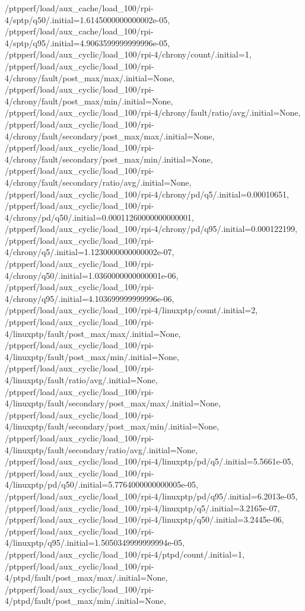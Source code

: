 {    /ptpperf/load/aux_cache/load_100/rpi-4/sptp/q50/.initial=1.6145000000000002e-05,
    /ptpperf/load/aux_cache/load_100/rpi-4/sptp/q95/.initial=4.9063599999999996e-05,
    /ptpperf/load/aux_cyclic/load_100/rpi-4/chrony/count/.initial=1,
    /ptpperf/load/aux_cyclic/load_100/rpi-4/chrony/fault/post_max/max/.initial=None,
    /ptpperf/load/aux_cyclic/load_100/rpi-4/chrony/fault/post_max/min/.initial=None,
    /ptpperf/load/aux_cyclic/load_100/rpi-4/chrony/fault/ratio/avg/.initial=None,
    /ptpperf/load/aux_cyclic/load_100/rpi-4/chrony/fault/secondary/post_max/max/.initial=None,
    /ptpperf/load/aux_cyclic/load_100/rpi-4/chrony/fault/secondary/post_max/min/.initial=None,
    /ptpperf/load/aux_cyclic/load_100/rpi-4/chrony/fault/secondary/ratio/avg/.initial=None,
    /ptpperf/load/aux_cyclic/load_100/rpi-4/chrony/pd/q5/.initial=0.00010651,
    /ptpperf/load/aux_cyclic/load_100/rpi-4/chrony/pd/q50/.initial=0.00011260000000000001,
    /ptpperf/load/aux_cyclic/load_100/rpi-4/chrony/pd/q95/.initial=0.000122199,
    /ptpperf/load/aux_cyclic/load_100/rpi-4/chrony/q5/.initial=1.1230000000000002e-07,
    /ptpperf/load/aux_cyclic/load_100/rpi-4/chrony/q50/.initial=1.0360000000000001e-06,
    /ptpperf/load/aux_cyclic/load_100/rpi-4/chrony/q95/.initial=4.103699999999996e-06,
    /ptpperf/load/aux_cyclic/load_100/rpi-4/linuxptp/count/.initial=2,
    /ptpperf/load/aux_cyclic/load_100/rpi-4/linuxptp/fault/post_max/max/.initial=None,
    /ptpperf/load/aux_cyclic/load_100/rpi-4/linuxptp/fault/post_max/min/.initial=None,
    /ptpperf/load/aux_cyclic/load_100/rpi-4/linuxptp/fault/ratio/avg/.initial=None,
    /ptpperf/load/aux_cyclic/load_100/rpi-4/linuxptp/fault/secondary/post_max/max/.initial=None,
    /ptpperf/load/aux_cyclic/load_100/rpi-4/linuxptp/fault/secondary/post_max/min/.initial=None,
    /ptpperf/load/aux_cyclic/load_100/rpi-4/linuxptp/fault/secondary/ratio/avg/.initial=None,
    /ptpperf/load/aux_cyclic/load_100/rpi-4/linuxptp/pd/q5/.initial=5.5661e-05,
    /ptpperf/load/aux_cyclic/load_100/rpi-4/linuxptp/pd/q50/.initial=5.7764000000000005e-05,
    /ptpperf/load/aux_cyclic/load_100/rpi-4/linuxptp/pd/q95/.initial=6.2013e-05,
    /ptpperf/load/aux_cyclic/load_100/rpi-4/linuxptp/q5/.initial=3.2165e-07,
    /ptpperf/load/aux_cyclic/load_100/rpi-4/linuxptp/q50/.initial=3.2445e-06,
    /ptpperf/load/aux_cyclic/load_100/rpi-4/linuxptp/q95/.initial=1.5050349999999994e-05,
    /ptpperf/load/aux_cyclic/load_100/rpi-4/ptpd/count/.initial=1,
    /ptpperf/load/aux_cyclic/load_100/rpi-4/ptpd/fault/post_max/max/.initial=None,
    /ptpperf/load/aux_cyclic/load_100/rpi-4/ptpd/fault/post_max/min/.initial=None,
}
